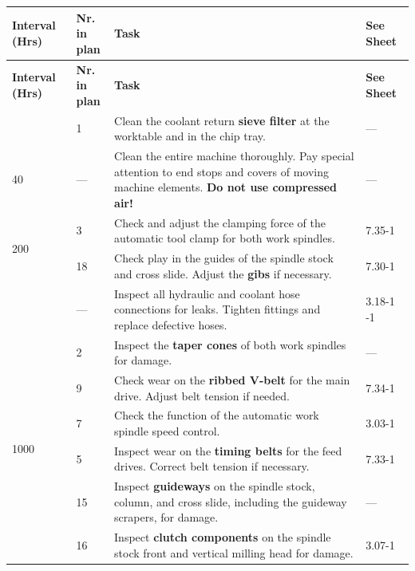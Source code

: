 
\renewcommand{\arraystretch}{1.3}
\begin{longtable}{|p{1.8cm}|p{1.2cm}|p{8.5cm}|p{2cm}|}
    \hline
    \textbf{Interval (Hrs)} & \textbf{Nr. in \newline plan} & \textbf{Task} & \textbf{See Sheet} \\
    \hline
    \endfirsthead

    \hline
    \textbf{Interval (Hrs)} & \textbf{Nr. in \newline plan} & \textbf{Task} & \textbf{See Sheet} \\
    \hline
    \endhead

    \hline
    \endfoot

    \multirow{1}{*}{8} & 1 & Clean the coolant return \textbf{sieve filter} at the worktable and in the chip tray. & --- \\
    \hline

    \multirow{1}{*}{40} & --- & Clean the entire machine thoroughly. Pay special attention to end stops and covers of moving machine elements. \textbf{Do not use compressed air!} & --- \\
    \hline

    \multirow{2}{*}{200} & 3 \newline 4 & Check and adjust the clamping force of the automatic tool clamp for both work spindles. & 7.35-1 \\
    \hline

    \multirow{2}{*}{500} & 18 & Check play in the guides of the spindle stock and cross slide. Adjust the \textbf{gibs} if necessary. & 7.30-1 \\
    \cline{2-4}
    & --- & Inspect all hydraulic and coolant hose connections for leaks. Tighten fittings and replace defective hoses. & 3.18-1 \newline 3.22-1 \\
    \hline

    \multirow{6}{*}{1000} & 2 \newline 17 & Inspect the \textbf{taper cones} of both work spindles for damage. & --- \\
    \cline{2-4}
    & 9 & Check wear on the \textbf{ribbed V-belt} for the main drive. Adjust belt tension if needed. & 7.34-1 \\
    \cline{2-4}
    & 7 & Check the function of the automatic work spindle speed control. & 3.03-1 \\
    \cline{2-4}
    & 5 \newline 10 \newline 14 & Inspect wear on the \textbf{timing belts} for the feed drives. Correct belt tension if necessary. & 7.33-1 \\
    \cline{2-4}
    & 15 & Inspect \textbf{guideways} on the spindle stock, column, and cross slide, including the guideway scrapers, for damage. & --- \\
    \cline{2-4}
    & 16 & Inspect \textbf{clutch components} on the spindle stock front and vertical milling head for damage. & 3.07-1 \\
    \hline
\end{longtable}

